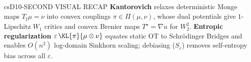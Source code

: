 \documentclass[../../../../master.tex]{subfiles}
\begin{document}
\begin{cscolumns}
\begin{cscard}{csD}{10-SECOND VISUAL RECAP}
  \sffamily\footnotesize
  \textbf{Kantorovich} relaxes deterministic Monge maps $T_\sharp\mu=\nu$ into convex couplings $\pi\in\Pi(\mu,\nu)$, whose dual potentials give $1$-Lipschitz $W_1$ critics and convex Brenier maps $T^\star=\nabla u$ for $W_2^2$.
  \textbf{Entropic regularization} $\varepsilon\,\KL{\pi}{\mu\otimes\nu}$ equates static OT to Schr\"odinger Bridges and enables $O(n^2)$ log-domain Sinkhorn scaling; debiasing ($S_\varepsilon$) removes self-entropy bias across all $\varepsilon$.
\end{cscard}
\end{cscolumns}

\csend
\end{document}
